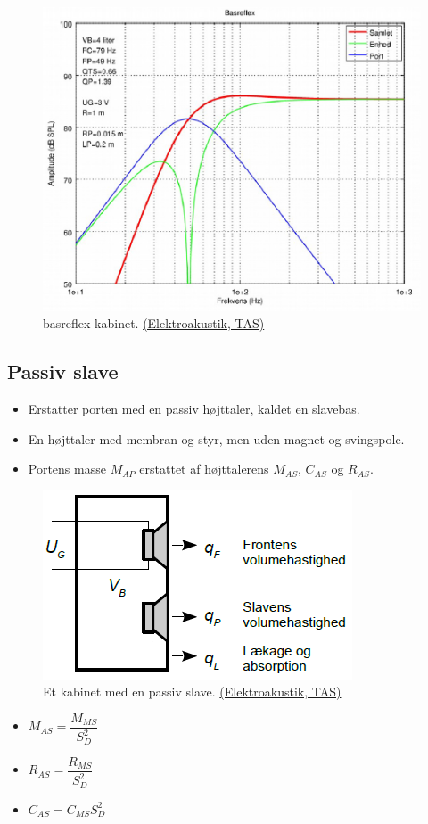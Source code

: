 \begin{figure} [H]
	\centering
	\includegraphics[width=0.75\linewidth]{graphics/60.png}
	\caption{basreflex kabinet. \href{http://www.torean.dk/artikel/Elektroakustik.pdf}{(Elektroakustik, TAS)}}
	\label{fig:60}
\end{figure}

\subsection{Passiv slave}
\begin{itemize}
	\item Erstatter porten med en passiv højttaler, kaldet en slavebas.
	\item En højttaler med membran og styr, men uden magnet og svingspole.
	\item Portens masse $M_{AP}$ erstattet af højttalerens $M_{AS}$, $C_{AS}$ og $R_{AS}$.
\end{itemize}

\begin{figure} [H]
	\centering
	\includegraphics[width=0.5\linewidth]{graphics/57.png}
	\caption{Et kabinet med en passiv slave. \href{http://www.torean.dk/artikel/Elektroakustik.pdf}{(Elektroakustik, TAS)}}
	\label{fig:57}
\end{figure}

\begin{itemize}
	\item $M_{AS}=\dfrac{M_{MS}}{S_D^2}$
	\item $R_{AS}=\dfrac{R_{MS}}{S_D^2}$
	\item $C_{AS}=C_{MS}S_D^2$
\end{itemize}

